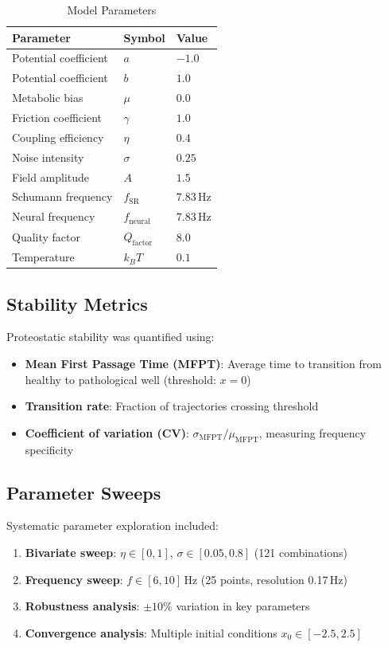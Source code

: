 \documentclass[10pt,a4paper]{article}
\begin{document}
\begin{table}[h]
\centering
\caption{Model Parameters}
\label{tab:parameters}
\begin{tabular}{lll}
\toprule
\textbf{Parameter} & \textbf{Symbol} & \textbf{Value} \\
\midrule
Potential coefficient & $a$ & $-1.0$ \\
Potential coefficient & $b$ & $1.0$ \\
Metabolic bias & $\mu$ & $0.0$ \\
Friction coefficient & $\gamma$ & $1.0$ \\
Coupling efficiency & $\eta$ & $0.4$ \\
Noise intensity & $\sigma$ & $0.25$ \\
Field amplitude & $A$ & $1.5$ \\
Schumann frequency & $f_{\text{SR}}$ & $7.83$\,Hz \\
Neural frequency & $f_{\text{neural}}$ & $7.83$\,Hz \\
Quality factor & $Q_{\text{factor}}$ & $8.0$ \\
Temperature & $k_B T$ & $0.1$ \\
\bottomrule
\end{tabular}
\end{table}

\subsection{Stability Metrics}

Proteostatic stability was quantified using:

\begin{itemize}
    \item \textbf{Mean First Passage Time (MFPT)}: Average time to transition from 
    healthy to pathological well (threshold: $x = 0$)
    \item \textbf{Transition rate}: Fraction of trajectories crossing threshold
    \item \textbf{Coefficient of variation (CV)}: $\sigma_{\text{MFPT}} / \mu_{\text{MFPT}}$, 
    measuring frequency specificity
\end{itemize}

\subsection{Parameter Sweeps}

Systematic parameter exploration included:
\begin{enumerate}
    \item \textbf{Bivariate sweep}: $\eta \in [0, 1]$, $\sigma \in [0.05, 0.8]$ (121 combinations)
    \item \textbf{Frequency sweep}: $f \in [6, 10]$\,Hz (25 points, resolution 0.17\,Hz)
    \item \textbf{Robustness analysis}: $\pm 10\%$ variation in key parameters
    \item \textbf{Convergence analysis}: Multiple initial conditions $x_0 \in [-2.5, 2.5]$
\end{enumerate}
\end{document}
